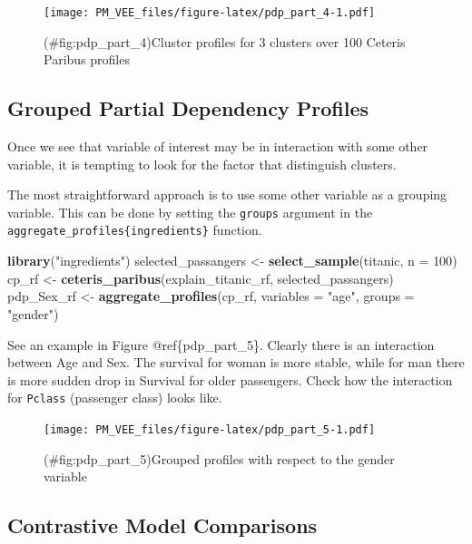 \documentclass[12pt,]{krantz}
\newenvironment{Shaded}{\begin{snugshade}}{\end{snugshade}}
\newcommand{\DataTypeTok}[1]{\textcolor[rgb]{0.13,0.29,0.53}{#1}}
\newcommand{\DecValTok}[1]{\textcolor[rgb]{0.00,0.00,0.81}{#1}}
\newcommand{\KeywordTok}[1]{\textcolor[rgb]{0.13,0.29,0.53}{\textbf{#1}}}
\newcommand{\NormalTok}[1]{#1}
\newcommand{\StringTok}[1]{\textcolor[rgb]{0.31,0.60,0.02}{#1}}
\theoremstyle{definition}
\theoremstyle{definition}
\theoremstyle{definition}
\theoremstyle{remark}
\begin{document}
\begin{figure}
\centering
\texttt{[image: PM\_VEE\_files/figure-latex/pdp\_part\_4-1.pdf]}
\caption{(\#fig:pdp\_part\_4)Cluster profiles for 3 clusters over 100
Ceteris Paribus profiles}
\end{figure}

\hypertarget{grouped-partial-dependency-profiles}{%
\subsection{Grouped Partial Dependency
Profiles}\label{grouped-partial-dependency-profiles}}

Once we see that variable of interest may be in interaction with some
other variable, it is tempting to look for the factor that distinguish
clusters.

The most straightforward approach is to use some other variable as a
grouping variable. This can be done by setting the \texttt{groups}
argument in the \texttt{aggregate\_profiles\{ingredients\}} function.

\begin{Shaded}
\begin{Highlighting}[]
\KeywordTok{library}\NormalTok{(}\StringTok{"ingredients"}\NormalTok{)}
\NormalTok{selected_passangers <-}\StringTok{ }\KeywordTok{select_sample}\NormalTok{(titanic, }\DataTypeTok{n =} \DecValTok{100}\NormalTok{)}
\NormalTok{cp_rf <-}\StringTok{ }\KeywordTok{ceteris_paribus}\NormalTok{(explain_titanic_rf, selected_passangers)}
\NormalTok{pdp_Sex_rf <-}\StringTok{ }\KeywordTok{aggregate_profiles}\NormalTok{(cp_rf, }\DataTypeTok{variables =} \StringTok{"age"}\NormalTok{,}
                \DataTypeTok{groups =} \StringTok{"gender"}\NormalTok{)}
\end{Highlighting}
\end{Shaded}

See an example in Figure @ref\{pdp\_part\_5\}. Clearly there is an
interaction between Age and Sex. The survival for woman is more stable,
while for man there is more sudden drop in Survival for older
passengers. Check how the interaction for \texttt{Pclass} (passenger
class) looks like.

\begin{figure}
\centering
\texttt{[image: PM\_VEE\_files/figure-latex/pdp\_part\_5-1.pdf]}
\caption{(\#fig:pdp\_part\_5)Grouped profiles with respect to the gender
variable}
\end{figure}

\hypertarget{contrastive-model-comparisons}{%
\subsection{Contrastive Model
Comparisons}\label{contrastive-model-comparisons}}
\end{document}
